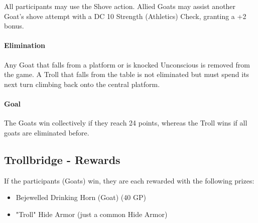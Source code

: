 {All participants may use the Shove action. Allied Goats may assist another Goat's shove attempt with a DC 10 Strength (Athletics) Check, granting a +2 bonus.

\paragraph*{Elimination} Any Goat that falls from a platform or is knocked Unconscious is removed from the game. A Troll that falls from the table is not eliminated but must spend its next turn climbing back onto the central platform.

\paragraph*{Goal} The Goats win collectively if they reach 24 points, whereas the Troll wins if all goats are eliminated before.}
\subsection*{Trollbridge - Rewards}
{\entryfont If the participants (Goats) win, they are each rewarded with the following prizes:
\begin{itemize}
	\item Bejewelled Drinking Horn (Goat) (40 GP)
	\item "Troll" Hide Armor (just a common Hide Armor)
\end{itemize}}
